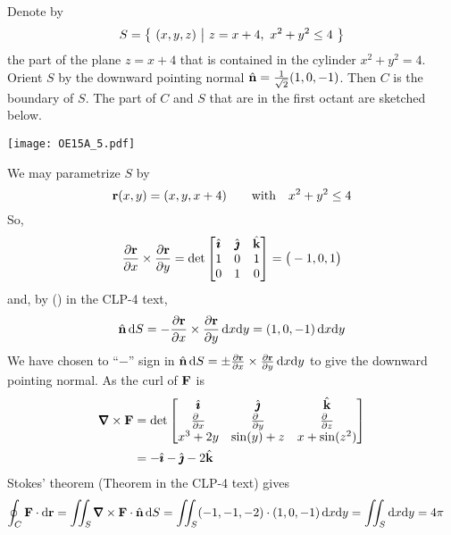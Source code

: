 \begin{solution}
Denote by
\begin{equation*}
S=\Set{(x,y,z)}{z=x+4,\ x^2+y^2\le 4}
\end{equation*}
the part of the plane $z=x+4$ that is contained in the cylinder
$x^2+y^2=4$. Orient $S$ by the downward pointing normal 
$\hat{\mathbf{n}} =\frac{1}{\sqrt{2}}(1,0,-1)$. Then $C$ is the boundary of $S$.
The part of $C$ and $S$ that are in the first octant are sketched below.
 \begin{center}
    \texttt{[image: OE15A\_5.pdf]}
\end{center}
We may parametrize $S$ by
\begin{equation*}
\mathbf{r}(x,y) = (x,y, x+4)\qquad\text{with}\quad x^2+y^2\le 4
\end{equation*}
So,
\begin{equation*}
\frac{\partial\mathbf{r}}{\partial x}\times\frac{\partial\mathbf{r}}{\partial y}
= \det\left[\begin{matrix} \hat{\pmb{\imath}} & \hat{\pmb{\jmath}} & \hat{\mathbf{k}} \\
1 & 0 & 1 \\
0 & 1 & 0 \end{matrix}\right]
= \big(-1, 0, 1\big)
\end{equation*}
and, by () in the CLP-4 text,
\begin{align*}
\hat{\mathbf{n}}\,\mathrm{d}S = -\frac{\partial\mathbf{r}}{\partial x}\times
            \frac{\partial\mathbf{r}}{\partial y}\,\mathrm{d}x\mathrm{d}y
= (1,0,-1)\,\mathrm{d}x\mathrm{d}y
\end{align*}
We have chosen to ``$-$'' sign in $\hat{\mathbf{n}}\,\mathrm{d}S = 
       \pm\frac{\partial\mathbf{r}}{\partial x}\times
        \frac{\partial\mathbf{r}}{\partial y}\,\mathrm{d}x\mathrm{d}y$
to give the downward pointing normal. As the curl of $\mathbf{F}$ is
\begin{align*}
\vnabla\times\vF
&=\det\left[\begin{matrix}
\hi &\hj &\hk \\
\tfrac{\partial\hfill}{\partial x} & \tfrac{\partial\hfill}{\partial y} & 
                \tfrac{\partial\hfill}{\partial z} \\
x^3 + 2y & \sin(y) + z &  x + \sin(z^2)
\end{matrix}
\right] \\
&= -\hi -\hj -2\hk
\end{align*}
Stokes' theorem (Theorem  in the CLP-4 text) gives
\begin{align*}
\oint_C\vF\cdot\dee{\vr}
&=\dblInt_S\vnabla\times\vF\cdot\hn\,\dee{S} 
=\dblInt_S (-1,-1,-2)\cdot(1,0,-1)\,\dee{x}\dee{y} 
=\dblInt_S \dee{x}\dee{y} 
=4\pi
\end{align*}
\end{solution}

